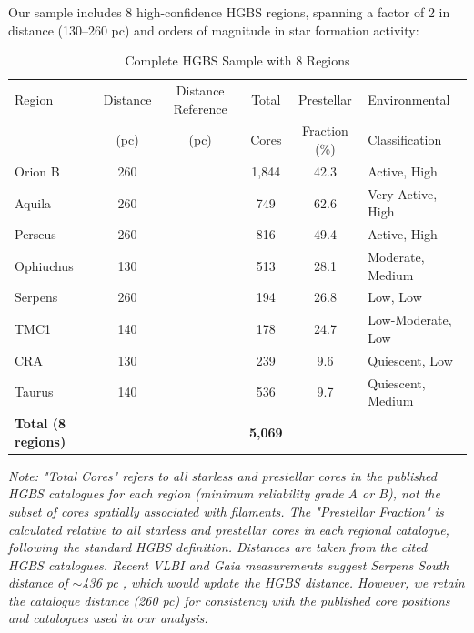 \documentclass[11pt,a4paper]{article}
\begin{document}
Our sample includes 8 high-confidence HGBS regions, spanning a factor of 2 in distance (130--260 pc) and orders of magnitude in star formation activity:

\begin{table}[H]
\centering
\caption{Complete HGBS Sample with 8 Regions}
\label{tab:sample_overview}
\begin{tabular}{lcccc}
\toprule
Region & Distance & Distance Reference & Total & Prestellar & Environmental \\
       & (pc)   & (pc)                  & Cores & Fraction (\%) & Classification \\
\midrule
Orion B  & 260     & \citep{Konyves2020}      & 1,844 & 42.3     & Active, High \\
Aquila   & 260     & \citep{Konyves2015}      & 749   & 62.6     & Very Active, High \\
Perseus  & 260     & \citep{Andre2016}        & 816   & 49.4     & Active, High \\
Ophiuchus& 130     & \citep{Ladjelate2020}     & 513   & 28.1     & Moderate, Medium \\
Serpens  & 260     & \citep{Konyves2015}      & 194   & 26.8     & Low, Low \\
TMC1     & 140     & \citep{Konyves2015}      & 178   & 24.7     & Low-Moderate, Low \\
CRA      & 130     & \citep{Neuhauser2000}     & 239   & 9.6      & Quiescent, Low \\
Taurus   & 140     & \citep{Konyves2015}      & 536   & 9.7      & Quiescent, Medium \\
\midrule
\textbf{Total (8 regions)} &        &        & \textbf{5,069} &        &  \\
\bottomrule
\end{tabular}
\vspace{-0.5em}
\small{\textit{Note: "Total Cores" refers to all starless and prestellar cores in the published HGBS catalogues for each region (minimum reliability grade A or B), not the subset of cores spatially associated with filaments. The "Prestellar Fraction" is calculated relative to all starless and prestellar cores in each regional catalogue, following the standard HGBS definition. Distances are taken from the cited HGBS catalogues. Recent VLBI and Gaia measurements suggest Serpens South distance of $\sim$436 pc \citep{OrtizLeon2018}, which would update the HGBS distance. However, we retain the catalogue distance (260 pc) for consistency with the published core positions and catalogues used in our analysis.}}
\end{table}
\end{document}
